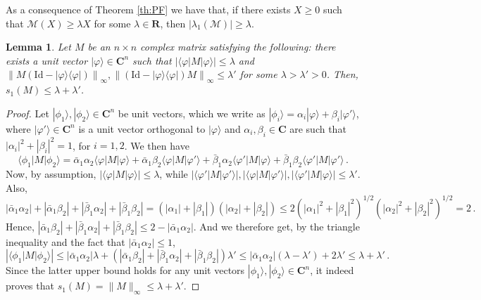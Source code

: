 \documentclass{amsart}
\newtheorem{lemma}[theorem]{Lemma}
\newcommand{\R}{\mathbf{R}}
\newcommand{\C}{\mathbf{C}}
\renewcommand{\leq}{\leqslant}
\renewcommand{\geq}{\geqslant}
\newcommand{\Id}{\mathrm{Id}}
\newcommand{\ketbra}[2]{| #1 \rangle\!\langle #2 |}
\newcommand{\bra}[1]{\langle #1 |}
\newcommand{\ket}[1]{| #1 \rangle}
\begin{document}
As a consequence of Theorem \ref{th:PF} we have that, if there exists $X\geq 0$ such that $\mathcal{M}(X) \geq \lambda X$ for some $\lambda\in\R$, then $|\lambda_1(\mathcal M)|\geq \lambda$.

\begin{lemma} \label{lem:max-sv}
    Let $M$ be an $n\times n$ complex matrix satisfying the following: there exists a unit vector $\ket{\varphi}\in\C^n$ such that $|\bra{\varphi}M\ket{\varphi}| \leq \lambda$ and $\left\|M\left(\Id-\ketbra{\varphi}{\varphi}\right)\right\|_{\infty},\left\|\left(\Id-\ketbra{\varphi}{\varphi}\right)M\right\|_{\infty}\leq \lambda'$ for some $\lambda>\lambda'>0$. Then, $s_1(M)\leq \lambda+\lambda'$.
\end{lemma}

\begin{proof}
    Let $\ket{\phi_1},\ket{\phi_2}\in\C^n$ be unit vectors, which we write as $\ket{\phi_i}=\alpha_i\ket{\varphi}+\beta_i\ket{\varphi'}$, where $\ket{\varphi'}\in\C^n$ is a unit vector orthogonal to $\ket{\varphi}$ and $\alpha_i,\beta_i\in\C$ are such that $|\alpha_i|^2+|\beta_i|^2=1$, for $i=1,2$.
    We then have
    \[ \bra{\phi_1}M\ket{\phi_2} = \bar{\alpha}_1\alpha_2\bra{\varphi}M\ket{\varphi} + \bar{\alpha}_1\beta_2\bra{\varphi}M\ket{\varphi'} + \bar{\beta}_1\alpha_2\bra{\varphi'}M\ket{\varphi} + \bar{\beta}_1\beta_2\bra{\varphi'}M\ket{\varphi'} \, . \]
    Now, by assumption, $|\bra{\varphi}M\ket{\varphi}| \leq \lambda$, while $\left| \bra{\varphi'}M\ket{\varphi'} \right|, \left| \bra{\varphi}M\ket{\varphi'} \right|, \left| \bra{\varphi'}M\ket{\varphi} \right| \leq \lambda'$. Also,
    \[ \left|\bar{\alpha}_1\alpha_2\right| + \left|\bar{\alpha}_1\beta_2\right| + \left|\bar{\beta}_1\alpha_2\right| + \left|\bar{\beta}_1\beta_2\right| = \left( \left|\alpha_1\right| + \left|\beta_1\right| \right) \left( \left|\alpha_2\right| + \left|\beta_2\right| \right) \leq 2 \left( \left|\alpha_1\right|^2 + \left|\beta_1\right|^2 \right)^{1/2} \left( \left|\alpha_2\right|^2 + \left|\beta_2\right|^2 \right)^{1/2} = 2 \, . \]
    Hence, $\left|\bar{\alpha}_1\beta_2\right| + \left|\bar{\beta}_1\alpha_2\right| + \left|\bar{\beta}_1\beta_2\right| \leq 2-\left|\bar{\alpha}_1\alpha_2\right|$. And we therefore get, by the triangle inequality and the fact that $\left|\bar{\alpha}_1\alpha_2\right|\leq 1$,
    \[ \left| \bra{\phi_1}M\ket{\phi_2} \right| \leq \left|\bar{\alpha}_1\alpha_2\right|\lambda+ \left( \left|\bar{\alpha}_1\beta_2\right| + \left|\bar{\beta}_1\alpha_2\right| + \left|\bar{\beta}_1\beta_2\right| \right)\lambda' \leq \left|\bar{\alpha}_1\alpha_2\right|(\lambda-\lambda')+2\lambda' \leq \lambda+\lambda' \, . \]
    Since the latter upper bound holds for any unit vectors $\ket{\phi_1},\ket{\phi_2}\in\C^n$, it indeed proves that $s_1(M)=\|M\|_{\infty}\leq \lambda+\lambda'$.
\end{proof}
\end{document}
